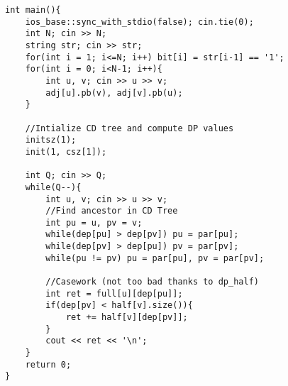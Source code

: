 \documentclass[15pt]{article}
\begin{document}
\begin{lstlisting}
int main(){
    ios_base::sync_with_stdio(false); cin.tie(0);
    int N; cin >> N;
    string str; cin >> str;
    for(int i = 1; i<=N; i++) bit[i] = str[i-1] == '1';
    for(int i = 0; i<N-1; i++){
        int u, v; cin >> u >> v;
        adj[u].pb(v), adj[v].pb(u);
    }
    
    //Intialize CD tree and compute DP values
    initsz(1);
    init(1, csz[1]);
 
    int Q; cin >> Q;
    while(Q--){
        int u, v; cin >> u >> v;
        //Find ancestor in CD Tree
        int pu = u, pv = v;
        while(dep[pu] > dep[pv]) pu = par[pu];
        while(dep[pv] > dep[pu]) pv = par[pv];
        while(pu != pv) pu = par[pu], pv = par[pv];
 
        //Casework (not too bad thanks to dp_half)
        int ret = full[u][dep[pu]];
        if(dep[pv] < half[v].size()){
            ret += half[v][dep[pv]];
        }
        cout << ret << '\n';
    }
    return 0;
}
\end{lstlisting}
\end{document}
